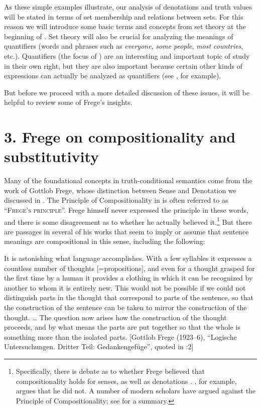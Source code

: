 As these simple examples illustrate, our analysis of denotations and truth values will be stated in terms of set membership and relations between sets. For this reason we will introduce some basic terms and concepts from set theory at the beginning of . Set theory will also be crucial for analyzing the meanings of quantifiers (words and phrases such as \textit{everyone}, \textit{some people}, \textit{most countries}, etc.). Quantifiers (the focus of ) are an interesting and important topic of study in their own right, but they are also important because certain other kinds of expressions can actually be analyzed as quantifiers (see , for example).



But before we proceed with a more detailed discussion of these issues, it will be helpful to review some of Frege’s insights.


\section{3. Frege on compositionality and substitutivity}\label{sec:}

Many of the foundational concepts in truth-conditional semantics come from the work of Gottlob Frege, whose distinction between Sense and Denotation we discussed in . The Principle of Compositionality in  is often referred to as “\textsc{Frege’s principle}”. Frege himself never expressed the principle in these words, and there is some disagreement as to whether he actually believed it.\footnote{Specifically, there is debate as to whether Frege believed that compositionality holds for senses, as well as denotations \citep[12]{Gamut1991b}. \citet{Pelletier2001}, for example, argues that he did not. A number of modern scholars have argued against the Principle of Compositionality; see \citet{Goldberg2015} for a summary.} But there are passages in several of his works that seem to imply or assume that sentence meanings are compositional in this sense, including the following:


It is astonishing what language accomplishes. With a few syllables it expresses a countless number of thoughts [=propositions], and even for a thought grasped for the first time by a human it provides a clothing in which it can be recognized by another to whom it is entirely new. This would not be possible if we could not distinguish parts in the thought that correspond to parts of the sentence, so that the construction of the sentence can be taken to mirror the construction of the thought. … The question now arises how the construction of the thought proceeds, and by what means the parts are put together so that the whole is something more than the isolated parts.   [Gottlob Frege (1923–6), “Logische Untersuchungen. Dritter Teil: Gedankengefüge”, quoted in \citealt{HeimKratzer1998}:2]


